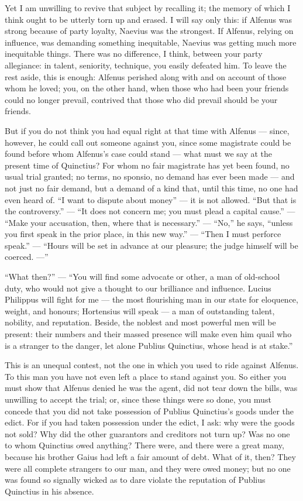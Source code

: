  Yet I am unwilling to revive that subject by recalling it; the memory of which I think ought to be utterly torn up and erased. I will say only this: if Alfenus was strong because of party loyalty, Naevius was the strongest. If Alfenus, relying on influence, was demanding something inequitable, Naevius was getting much more inequitable things. There was no difference, I think, between your party allegiance: in talent, seniority, technique, you easily defeated him. To leave the rest aside, this is enough: Alfenus perished along with and on account of those whom he loved; you, on the other hand, when those who had been your friends could no longer prevail, contrived that those who did prevail should be your friends.

 But if you do not think you had equal right at that time with Alfenus --- since, however, he could call out someone against you, since some magistrate could be found before whom Alfenus's case could stand --- what must we say at the present time of Quinctius? For whom no fair magistrate has yet been found, no usual trial granted; no terms, no sponsio, no demand has ever been made --- and not just no fair demand, but a demand of a kind that, until this time, no one had even heard of. ``I want to dispute about money'' --- it is not allowed. ``But that is the controversy.'' --- ``It does not concern me; you must plead a capital cause.'' --- ``Make your accusation, then, where that is necessary.'' --- ``No,'' he says, ``unless you first speak in the prior place, in this new way.'' --- ``Then I must perforce speak.'' --- ``Hours will be set in advance at our pleasure; the judge himself will be coerced. ---''

 ``What then?'' --- ``You will find some advocate or other, a man of old-school duty, who would not give a thought to our brilliance and influence. Lucius Philippus will fight for me --- the most flourishing man in our state for eloquence, weight, and honours; Hortensius will speak --- a man of outstanding talent, nobility, and reputation. Beside, the noblest and most powerful men will be present: their numbers and their massed presence will make even him quail who is a stranger to the danger, let alone Publius Quinctius, whose head is at stake.''

 This is an unequal contest, not the one in which you used to ride against Alfenus. To this man you have not even left a place to stand against you. So either you must show that Alfenus denied he was the agent, did not tear down the bills, was unwilling to accept the trial; or, since these things were so done, you must concede that you did not take possession of Publius Quinctius's goods under the edict. For if you had taken possession under the edict, I ask: why were the goods not sold? Why did the other guarantors and creditors not turn up? Was no one to whom Quinctius owed anything? There were, and there were a great many, because his brother Gaius had left a fair amount of debt. What of it, then? They were all complete strangers to our man, and they were owed money; but no one was found so signally wicked as to dare violate the reputation of Publius Quinctius in his absence.

